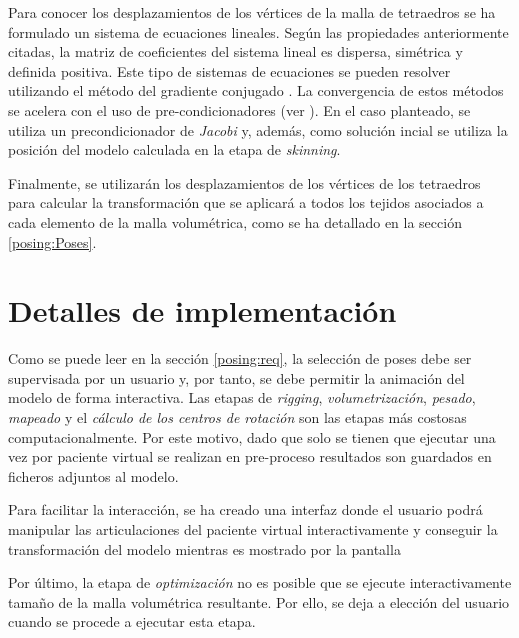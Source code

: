 Para conocer los desplazamientos de los vértices de la malla de tetraedros se ha formulado un sistema de ecuaciones lineales. Según las propiedades anteriormente citadas, la matriz de coeficientes del sistema lineal es dispersa, simétrica y definida positiva. Este tipo de sistemas de ecuaciones se pueden resolver utilizando el método del gradiente conjugado \cite{Press2007}. La convergencia de estos métodos se acelera con el uso de pre-condicionadores (ver \cite{hauth2003}). En el caso planteado, se utiliza un precondicionador de \emph{Jacobi} y, además,  como solución incial se utiliza la posición del modelo calculada en la etapa de \emph{skinning}. %

Finalmente, se utilizarán los desplazamientos de los vértices de los tetraedros para calcular la transformación que se aplicará a todos los tejidos asociados a cada elemento de la malla volumétrica, como se ha detallado en la sección \ref{posing:Poses}.%



\section{Detalles de implementación}
\label{posing:preprocess}

Como se puede leer en la sección \ref{posing:req}, la selección de poses debe ser supervisada por un usuario y, por tanto, se debe permitir la animación del modelo de forma interactiva. 
Las etapas de \emph{rigging}, \emph{volumetrización}, \emph{pesado}, \emph{mapeado} y el \emph{cálculo de los centros de rotación} son las etapas más costosas computacionalmente. 
Por este motivo, dado que solo se tienen que ejecutar una vez por paciente virtual\new{,} se realizan en pre-proceso   resultados son guardados en ficheros adjuntos al modelo. 

Para facilitar la interacción, se ha creado una interfaz donde el usuario podrá manipular las articulaciones del paciente virtual\new{,} interactivamente y conseguir la transformación del modelo mientras es mostrado por la pantalla 

Por último, la etapa de \emph{optimización} no es posible que se ejecute interactivamente   tamaño de la malla volumétrica resultante. Por ello, se deja a elección del usuario cuando se procede a ejecutar esta etapa.


